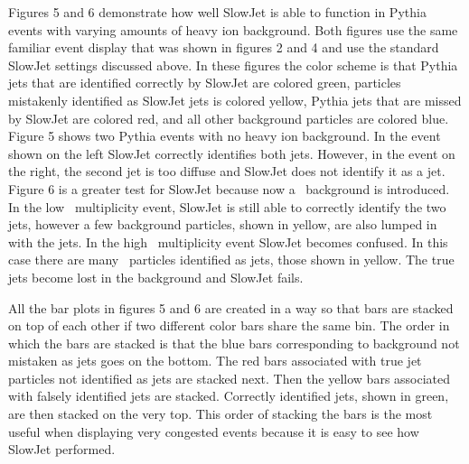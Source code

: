 \documentclass[11pt]{article}
\begin{document}
Figures 5 and 6 demonstrate how well SlowJet is able to function in Pythia events with varying amounts of heavy ion background. Both figures use the same familiar event display that was shown in figures 2 and 4 and use the standard SlowJet settings discussed above. In these figures the color scheme is that Pythia jets that are identified correctly by SlowJet are colored green, particles mistakenly identified as SlowJet jets is colored yellow,  Pythia jets that are missed by SlowJet are colored red, and all other background particles are colored blue. Figure 5 shows two Pythia events with no heavy ion background. In the event shown on the left SlowJet correctly identifies both jets. However, in the event on the right, the second jet is too diffuse and SlowJet does not identify it as a jet. Figure 6 is a greater test for SlowJet because now a \trento\ background is introduced. In the low \trento\ multiplicity event, SlowJet is still able to correctly identify the two jets, however a few background particles, shown in yellow, are also lumped in with the jets.  In the high \trento\ multiplicity event SlowJet becomes confused. In this case there are many \trento\ particles identified as jets, those shown in yellow. The true jets become lost in the background and SlowJet fails.

All the bar plots in figures 5 and 6 are created in a way so that bars are stacked on top of each other if two different color bars share the same bin. The order in which the bars are stacked is that the blue bars corresponding to background not mistaken as jets goes on the bottom. The red bars associated with true jet particles not identified as jets are stacked next. Then the yellow bars associated with falsely identified jets are stacked. Correctly identified jets, shown in green, are then stacked on the very top. This order of stacking the bars is the most useful when displaying very congested events because it is easy to see how SlowJet performed.
\end{document}

